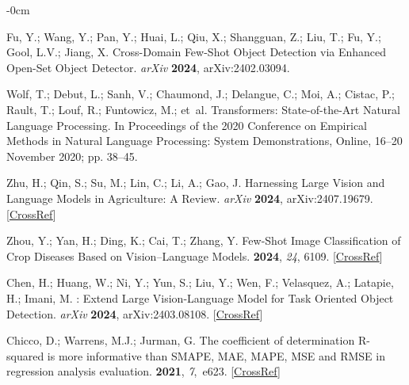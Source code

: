 \documentclass[12pt,a4paper,oneside]{report}
\newlength{\extralength}
\begin{document}
\begin{adjustwidth}{-\extralength}{0cm}
\begin{thebibliography}{999}
Fu, Y.; Wang, Y.; Pan, Y.; Huai, L.; Qiu, X.; Shangguan, Z.; Liu, T.; Fu, Y.;
Gool, L.V.; Jiang, X.
\newblock Cross-{{Domain Few-Shot Object Detection}} via {{Enhanced Open-Set
Object Detector}}. {\em arXiv} {\bf2024}, arXiv:2402.03094. 

Wolf, T.; Debut, L.; Sanh, V.; Chaumond, J.; Delangue, C.; Moi, A.; Cistac, P.;
Rault, T.; Louf, R.; Funtowicz, M.;  et~al.
\newblock Transformers: {{State-of-the-Art Natural Language Processing}}.
\newblock In Proceedings of the 2020 Conference on Empirical Methods in Natural Language Processing: System Demonstrations, Online, 16--20 November 2020; pp. 38--45. 

Zhu, H.; Qin, S.; Su, M.; Lin, C.; Li, A.; Gao, J.
\newblock Harnessing {Large} {Vision} and {Language} {Models} in {Agriculture}:
{A} {Review}. {\em arXiv} {\bf2024}, arXiv:2407.19679. 
[\href{https://doi.org/10.48550/arXiv.2407.19679}{CrossRef}]

Zhou, Y.; Yan, H.; Ding, K.; Cai, T.; Zhang, Y.
\newblock Few-Shot Image Classification of Crop Diseases Based on
Vision–Language Models.
 {\bf 2024}, {\em 24}, 6109. [\href{http://dx.doi.org/10.3390/s24186109}{CrossRef}]

Chen, H.; Huang, W.; Ni, Y.; Yun, S.; Liu, Y.; Wen, F.; Velasquez, A.; Latapie,
H.; Imani, M.
: {Extend} {Large} {Vision}-{Language} {Model} for {Task}
{Oriented} {Object} {Detection}. {\em arXiv} {\bf2024}, arXiv:2403.08108. 
[\href{https://doi.org/10.48550/arXiv.2403.08108}{CrossRef}]

Chicco, D.; Warrens, M.J.; Jurman, G.
\newblock The coefficient of determination {R}-squared is more informative than
{SMAPE}, {MAE}, {MAPE}, {MSE} and {RMSE} in regression analysis evaluation.
 {\bf 2021}, {\em 7},~e623. [\href{http://dx.doi.org/10.7717/peerj-cs.623}{CrossRef}]


\end{thebibliography}
\end{adjustwidth}
\end{document}
